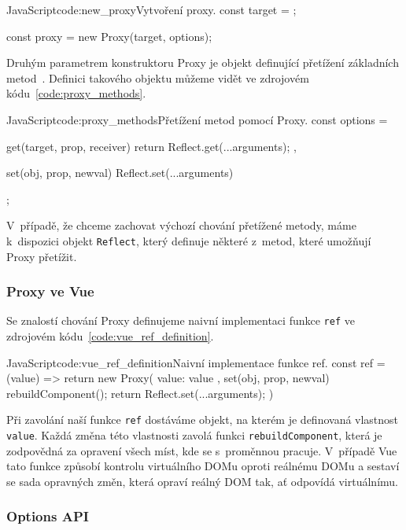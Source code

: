 \documentclass[
  master,
  program=ainf,
  printversion,
  tables=false,
  sourcecodes,
  glossaries,
  index
]{kidiplom}
\begin{document}
\begin{kicode}{JavaScript}{code:new_proxy}{Vytvoření proxy.}
  const target = {};

  const proxy = new Proxy(target, options);
\end{kicode}

Druhým parametrem konstruktoru Proxy je objekt definující přetížení základních metod~\cite{default_methods}. 
Definici takového objektu můžeme vidět ve zdrojovém kódu~\ref{code:proxy_methods}.

\begin{kicode}{JavaScript}{code:proxy_methods}{Přetížení metod pomocí Proxy.}
  const options = {
    get(target, prop, receiver) {
      return Reflect.get(...arguments);
    },

    set(obj, prop, newval) {
      Reflect.set(...arguments)
    }
  };
\end{kicode}

V~případě, že chceme zachovat výchozí chování přetížené metody, máme k~dispozici objekt
{\tt Reflect}, který definuje některé z~metod, které umožňují Proxy přetížit.


\subsubsection{Proxy ve Vue}

Se znalostí chování Proxy definujeme naivní implementaci funkce {\tt ref} ve zdrojovém kódu~\ref{code:vue_ref_definition}. 

\begin{kicode}{JavaScript}{code:vue_ref_definition}{Naivní implementace funkce ref.}
  const ref = (value) => {
    return new Proxy({ value: value }, {
      set(obj, prop, newval) {
        rebuildComponent();
        return Reflect.set(...arguments);
      }
    })
  }
\end{kicode}

Při zavolání naší funkce {\tt ref} dostáváme objekt, na kterém je definovaná vlastnost {\tt value}. 
Každá změna této vlastnosti zavolá funkci {\tt rebuildComponent}, která je zodpovědná za
opravení všech míst, kde se s~proměnnou pracuje. V~případě Vue tato funkce způsobí
kontrolu virtuálního DOMu oproti reálnému DOMu a sestaví se sada opravných změn, která
opraví reálný DOM tak, ať odpovídá virtuálnímu.

\subsubsection{Options API}
\end{document}
